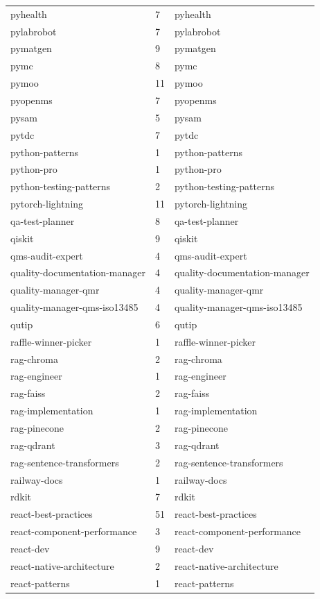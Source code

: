 \begin{longtable}{@{}lll@{}}
pyhealth & 7 & pyhealth\\
pylabrobot & 7 & pylabrobot\\
pymatgen & 9 & pymatgen\\
pymc & 8 & pymc\\
pymoo & 11 & pymoo\\
pyopenms & 7 & pyopenms\\
pysam & 5 & pysam\\
pytdc & 7 & pytdc\\
python-patterns & 1 & python-patterns\\
python-pro & 1 & python-pro\\
python-testing-patterns & 2 & python-testing-patterns\\
pytorch-lightning & 11 & pytorch-lightning\\
qa-test-planner & 8 & qa-test-planner\\
qiskit & 9 & qiskit\\
qms-audit-expert & 4 & qms-audit-expert\\
quality-documentation-manager & 4 & quality-documentation-manager\\
quality-manager-qmr & 4 & quality-manager-qmr\\
quality-manager-qms-iso13485 & 4 & quality-manager-qms-iso13485\\
qutip & 6 & qutip\\
raffle-winner-picker & 1 & raffle-winner-picker\\
rag-chroma & 2 & rag-chroma\\
rag-engineer & 1 & rag-engineer\\
rag-faiss & 2 & rag-faiss\\
rag-implementation & 1 & rag-implementation\\
rag-pinecone & 2 & rag-pinecone\\
rag-qdrant & 3 & rag-qdrant\\
rag-sentence-transformers & 2 & rag-sentence-transformers\\
railway-docs & 1 & railway-docs\\
rdkit & 7 & rdkit\\
react-best-practices & 51 & react-best-practices\\
react-component-performance & 3 & react-component-performance\\
react-dev & 9 & react-dev\\
react-native-architecture & 2 & react-native-architecture\\
react-patterns & 1 & react-patterns\\

\end{longtable}
